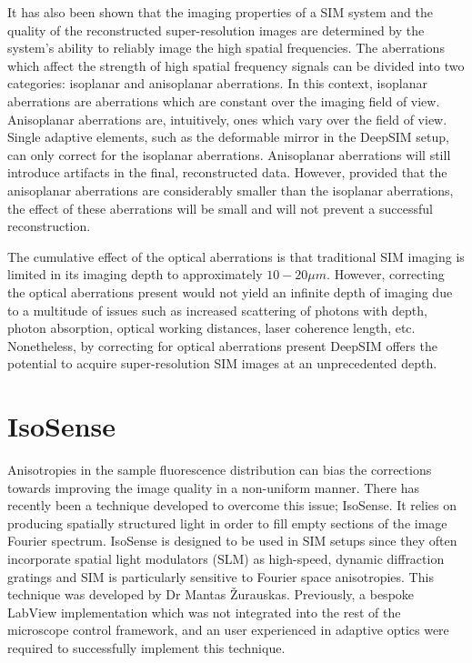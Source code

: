 It has also been shown that the imaging properties of a SIM
system and the quality of the reconstructed super-resolution
images are determined by the system's ability to reliably
image the high spatial frequencies\cite{debarre2008adaptive,thomas2015enhanced}.
The aberrations which affect the strength of high spatial 
frequency signals can be divided into two categories: 
isoplanar and anisoplanar aberrations. In this context, 
isoplanar aberrations are aberrations which are constant 
over the imaging field of view. Anisoplanar aberrations 
are, intuitively, ones which vary over the field of view. 
Single adaptive elements, such as the deformable mirror 
in the DeepSIM setup, can only correct for the isoplanar 
aberrations. Anisoplanar aberrations will still introduce 
artifacts in the final, reconstructed data. However, provided 
that the anisoplanar aberrations are considerably smaller than
the isoplanar aberrations, the effect of these aberrations will 
be small and will not prevent a successful
reconstruction\cite{thomas2015enhanced}.

The cumulative effect of the optical aberrations is that
traditional SIM imaging is limited in its imaging depth to
approximately $10-20\mu m$\cite{schermelleh2019super,wu2018faster}. However, 
correcting the optical aberrations present would not yield
an infinite depth of imaging due to a multitude of issues such 
as increased scattering of photons with depth, photon absorption, 
optical working distances, laser coherence length, etc. 
Nonetheless, by correcting for optical aberrations present 
DeepSIM offers the potential to acquire super-resolution SIM 
images at an unprecedented depth.

\section{IsoSense}
\label{sec:isosense}

Anisotropies in the sample fluorescence distribution can bias 
the corrections towards improving the image quality in a 
non-uniform manner. There has recently been a technique developed 
to overcome  this issue; IsoSense\cite{vzurauskas2019isosense}.  
It relies  on producing spatially structured light in order to fill 
empty sections of the image Fourier spectrum. IsoSense is designed 
to be used in SIM setups since 
they often incorporate spatial light modulators (SLM) as high-speed, 
dynamic diffraction  gratings and SIM is particularly sensitive to 
Fourier space anisotropies. This technique was developed by Dr Mantas 
\v{Z}urauskas. Previously, a bespoke LabView implementation which was
not integrated into the rest of the microscope control 
framework, and an user experienced in adaptive optics were required 
to successfully implement this technique.

